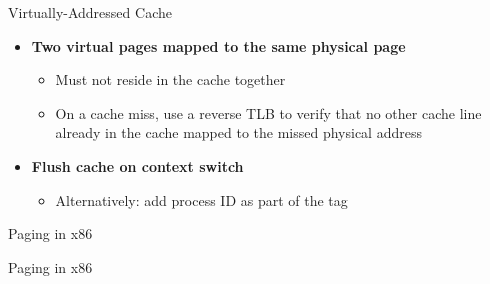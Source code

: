 \documentclass[aspectratio=169,12pt]{beamer}
\begin{document}
\begin{frame}{Virtually-Addressed Cache}
\begin{center}
\begin{tikzpicture}
\end{tikzpicture}
\end{center}

\vspace{0.1cm}
\begin{itemize}
\item \textbf{Two virtual pages mapped to the same physical page}
    \begin{itemize}
    \item Must not reside in the cache together
    \item On a cache miss, use a reverse TLB to verify that no other cache line already in the cache mapped to the missed physical address
    \end{itemize}
    
\item \textbf{Flush cache on context switch}
    \begin{itemize}
    \item Alternatively: add process ID as part of the tag
    \end{itemize}
\end{itemize}
\end{frame}

\begin{frame}{Paging in x86}
\begin{center}
\Huge Paging in x86
\end{center}
\end{frame}
\end{document}

